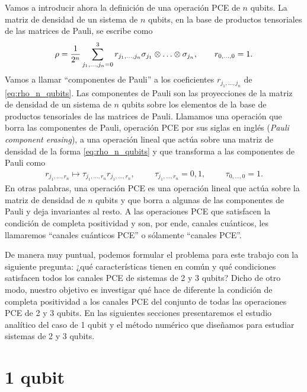 Vamos a introducir ahora la definición de una operación PCE de 
$n$ qubits. La matriz de densidad de un sistema de $n$ qubits, en la base de
productos tensoriales de las matrices de Pauli, se escribe como
\begin{align}\label{eq:rho_n_qubits}
\rho=\frac{1}{2^n}\sum_{j_1,\ldots,j_n=0}^3
r_{j_1,\ldots,j_n}\sigma_{j_1}\otimes\ldots\otimes\sigma_{j_n},
\qquad r_{0,\ldots,0}=1.
\end{align}
Vamos a llamar ``componentes de Pauli'' a los coeficientes $r_{j_1,\ldots,j_n}$
de \eqref{eq:rho_n_qubits}. Las componentes de Pauli son las proyecciones
de la matriz de densidad de un sistema de $n$ qubits sobre los elementos
de la base de productos tensoriales de las matrices de Pauli.
Llamamos una operación que borra las componentes de Pauli, 
operación PCE por sus siglas en inglés (\textit{Pauli
component erasing}), a una operación lineal que actúa sobre una 
matriz de densidad de la forma \eqref{eq:rho_n_qubits} y 
que transforma a las componentes de Pauli como
\begin{align}\label{eq:PCE_definition}
r_{j_1,\ldots,r_n}\longmapsto \tau_{j_1,\ldots,r_n}r_{j_1,\ldots,r_n},
\hspace{1cm} \tau_{j_1,\ldots,r_n} = 0,1,
\hspace{1cm} \tau_{0,\ldots,0}=1.
\end{align}
En otras palabras, una operación PCE es una operación lineal que actúa sobre la
matriz de densidad de $n$ qubits y que borra a algunas de las componentes de
Pauli y deja invariantes al resto.
A las operaciones PCE que satisfacen 
la condición de completa positividad y son, por ende, canales cuánticos,
les llamaremos ``canales cuánticos PCE'' o sólamente ``canales PCE''.

De manera muy puntual, podemos formular el problema para 
este trabajo con la siguiente pregunta: ¿qué características tienen 
en común y qué condiciones satisfacen todos los canales PCE 
de sistemas de 2 y 3 qubits? Dicho de otro modo, 
nuestro objetivo es investigar qué hace de diferente la condición de 
completa positividad a los canales PCE del conjunto de todas las 
operaciones PCE de 2 y 3 qubits.
En las siguientes secciones presentaremos el estudio analítico del 
caso de 1 qubit y el método numérico que diseñamos 
para estudiar sistemas de 2 y 3 qubits. 


\section{1 qubit} %
\label{sec:1_qubit_problem}
%

